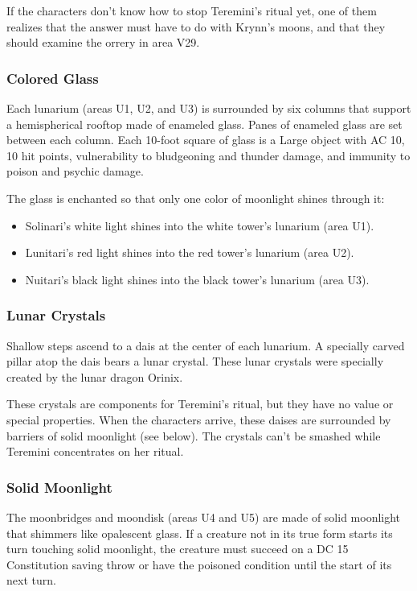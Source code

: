 \documentclass[10pt,a4paper,twoside,bg=print,twocolumn,openany,nodeprecatedcode]{dndbook}
\begin{document}
If the characters don't know how to stop Teremini's ritual yet, one of them realizes that the answer must have to do with Krynn's moons, and that they should examine the orrery in area V29.

\subsubsection{Colored Glass}
Each lunarium (areas U1, U2, and U3) is surrounded by six columns that support a hemispherical rooftop made of enameled glass. Panes of enameled glass are set between each column. Each 10-foot square of glass is a Large object with AC 10, 10 hit points, vulnerability to bludgeoning and thunder damage, and immunity to poison and psychic damage.

The glass is enchanted so that only one color of moonlight shines through it:


\begin{itemize}
\item Solinari's white light shines into the white tower's lunarium (area U1).
\item Lunitari's red light shines into the red tower's lunarium (area U2).
\item Nuitari's black light shines into the black tower's lunarium (area U3).
\end{itemize}

\subsubsection{Lunar Crystals}
Shallow steps ascend to a dais at the center of each lunarium. A specially carved pillar atop the dais bears a lunar crystal. These lunar crystals were specially created by the lunar dragon Orinix.

These crystals are components for Teremini's ritual, but they have no value or special properties. When the characters arrive, these daises are surrounded by barriers of solid moonlight (see below). The crystals can't be smashed while Teremini concentrates on her ritual.

\subsubsection{Solid Moonlight}
The moonbridges and moondisk (areas U4 and U5) are made of solid moonlight that shimmers like opalescent glass. If a creature not in its true form starts its turn touching solid moonlight, the creature must succeed on a DC 15 Constitution saving throw or have the poisoned condition until the start of its next turn.
\end{document}
